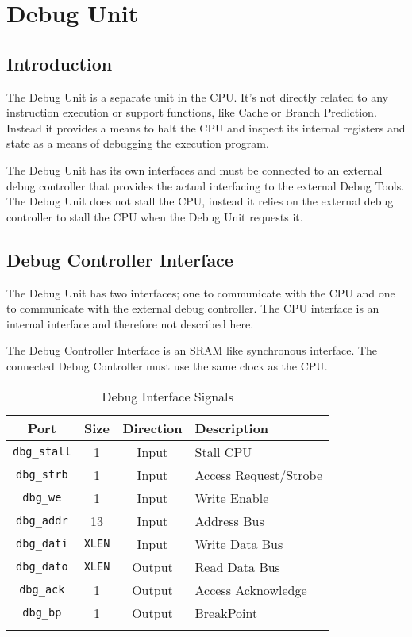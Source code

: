 \section{Debug Unit}\label{debug-unit-1}

\subsection{Introduction}\label{introduction-4}

The Debug Unit is a separate unit in the CPU. It's not directly related
to any instruction execution or support functions, like Cache or Branch
Prediction. Instead it provides a means to halt the CPU and inspect its
internal registers and state as a means of debugging the execution
program.

The Debug Unit has its own interfaces and must be connected to an
external debug controller that provides the actual interfacing to the
external Debug Tools. The Debug Unit does not stall the CPU, instead it
relies on the external debug controller to stall the CPU when the Debug
Unit requests it.

\subsection{Debug Controller Interface
}\label{debug-controller-interface}

The Debug Unit has two interfaces; one to communicate with the CPU and
one to communicate with the external debug controller. The CPU interface
is an internal interface and therefore not described here.

The Debug Controller Interface is an SRAM like synchronous interface.
The connected Debug Controller must use the same clock as the CPU.

\begin{longtable}[]{@{}cccl@{}}
\toprule
Port & Size & Direction & Description\tabularnewline
\midrule
\endhead
\texttt{dbg\_stall} & 1 & Input & Stall CPU\tabularnewline
\texttt{dbg\_strb}  & 1 & Input & Access Request/Strobe\tabularnewline
\texttt{dbg\_we}    & 1 & Input & Write Enable\tabularnewline
\texttt{dbg\_addr}  & 13 & Input & Address Bus\tabularnewline
\texttt{dbg\_dati}  & \texttt{XLEN} & Input & Write Data Bus\tabularnewline
\texttt{dbg\_dato}  & \texttt{XLEN} & Output & Read Data Bus\tabularnewline
\texttt{dbg\_ack}   & 1 & Output & Access Acknowledge\tabularnewline
\texttt{dbg\_bp}    & 1 & Output & BreakPoint\tabularnewline
\bottomrule
\caption{Debug Interface Signals}
\label{tab:debug-if-signals}
\end{longtable}

